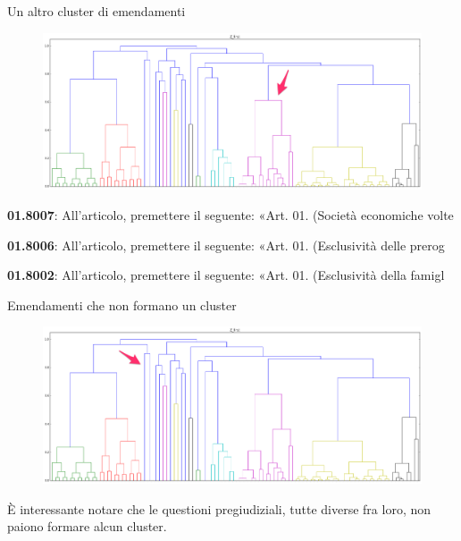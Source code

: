\documentclass[12pt]{beamer}
\begin{document}
  \begin{frame}{Un altro cluster di emendamenti}
    \begin{figure}
      \centering
      \includegraphics[width=\textwidth]{tex/img/tree-first-second-cluster}
    \end{figure}

    \vspace{0.25cm}

    {
      \scriptsize
      \textbf{01.8007}: All'articolo, premettere il seguente: «Art. 01. (Società economiche volte\textellipsis

      \textbf{01.8006}: All'articolo, premettere il seguente: «Art. 01. (Esclusività delle prerog\textellipsis

      \textbf{01.8002}: All'articolo, premettere il seguente: «Art. 01. (Esclusività della famigl\textellipsis

    }
  \end{frame}

  \begin{frame}{Emendamenti che non formano un cluster}
    \begin{figure}
      \centering
      \includegraphics[width=\textwidth]{tex/img/tree-first-no-cluster}
    \end{figure}

    \vspace{0.25cm}

    È interessante notare che le questioni pregiudiziali, tutte diverse fra
    loro, non paiono formare alcun cluster.
  \end{frame}
\end{document}
